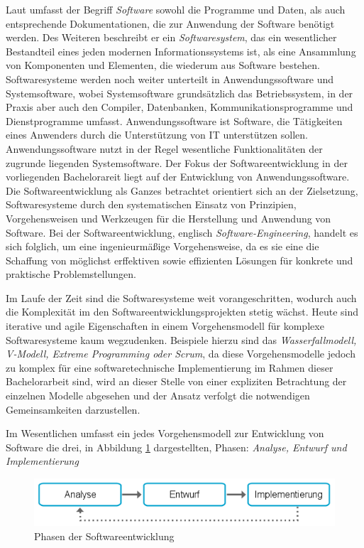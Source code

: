 Laut \citeauthor{Balzert.2009} umfasst der Begriff \textit{Software} sowohl die Programme und Daten, als auch entsprechende Dokumentationen, die zur Anwendung der Software benötigt werden. Des Weiteren beschreibt er ein \textit{Softwaresystem}, das ein wesentlicher Bestandteil eines jeden modernen Informationssystems ist, als eine Ansammlung von Komponenten und Elementen, die wiederum aus Software bestehen. Softwaresysteme werden noch weiter unterteilt in Anwendungssoftware und Systemsoftware, wobei Systemsoftware grundsätzlich das Betriebssystem, in der Praxis aber auch den Compiler, Datenbanken, Kommunikationsprogramme und Dienstprogramme umfasst.
\cite{Balzert.2009}
Anwendungssoftware ist Software, die Tätigkeiten eines Anwenders durch die Unterstützung von \ac{IT} unterstützen sollen. 
Anwendungssoftware nutzt in der Regel wesentliche Funktionalitäten der zugrunde liegenden Systemsoftware. Der Fokus der Softwareentwicklung in der vorliegenden Bachelorareit liegt auf der Entwicklung von Anwendungssoftware. 
\cite{Balzert.2009}
Die Softwareentwicklung als Ganzes betrachtet orientiert sich an der Zielsetzung, Softwaresysteme durch den systematischen Einsatz von Prinzipien, Vorgehensweisen und Werkzeugen für die Herstellung und Anwendung von Software.
\cite{Balzert.2009}
Bei der Softwareentwicklung, englisch \textit{Software-Engineering}, handelt es sich folglich, um eine ingenieurmäßige Vorgehensweise, da es sie eine die Schaffung von möglichst erffektiven sowie effizienten Lösungen für konkrete und praktische Problemstellungen.
\cite{Balzert.2009}

Im Laufe der Zeit sind die Softwaresysteme weit vorangeschritten, wodurch auch die Komplexität im den Softwareentwicklungsprojekten stetig wächst. Heute sind iterative und agile Eigenschaften in einem Vorgehensmodell für komplexe Softwaresysteme kaum wegzudenken. Beispiele hierzu sind das \textit{Wasserfallmodell, V-Modell, Extreme Programming oder Scrum}, da diese Vorgehensmodelle jedoch zu komplex für eine softwaretechnische Implementierung im Rahmen dieser Bachelorarbeit sind, wird an dieser Stelle von einer expliziten Betrachtung der einzelnen Modelle abgesehen und der Ansatz verfolgt die notwendigen Gemeinsamkeiten darzustellen.
\cite{Krypczyk.2018}

Im Wesentlichen umfasst ein jedes Vorgehensmodell zur Entwicklung von Software die drei, in Abbildung \ref{fig:Phasen der Softwareentwicklung} dargestellten, Phasen: \textit{Analyse, Entwurf und Implementierung}

\begin{figure}[H]
	\centering 
    \includegraphics[width=\textwidth]{img/entwicklung.png}	
    \caption[Phasen der Softwareentwicklung]
    {Phasen der Softwareentwicklung\protect\footnotemark}
    \label{fig:Phasen der Softwareentwicklung}
\end{figure}

